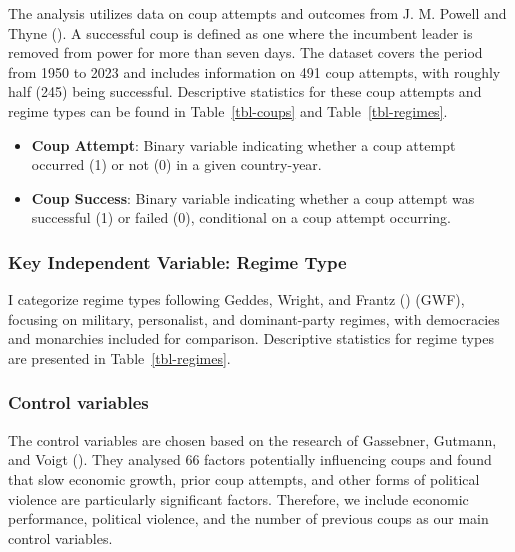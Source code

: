 \documentclass[
  12pt,
]{report}
\begin{document}
The analysis utilizes data on coup attempts and outcomes from J. M.
Powell and Thyne (). A successful coup is
defined as one where the incumbent leader is removed from power for more
than seven days. The dataset covers the period from 1950 to 2023 and
includes information on 491 coup attempts, with roughly half (245) being
successful. Descriptive statistics for these coup attempts and regime
types can be found in Table~\ref{tbl-coups} and Table~\ref{tbl-regimes}.

\begin{itemize}
\item
  \textbf{Coup Attempt}: Binary variable indicating whether a coup
  attempt occurred (1) or not (0) in a given country-year.
\item
  \textbf{Coup Success}: Binary variable indicating whether a coup
  attempt was successful (1) or failed (0), conditional on a coup
  attempt occurring.
\end{itemize}

\subsubsection{Key Independent Variable: Regime
Type}\label{sec-chapter2322}

I categorize regime types following Geddes, Wright, and Frantz
() (GWF), focusing on military,
personalist, and dominant-party regimes, with democracies and monarchies
included for comparison. Descriptive statistics for regime types are
presented in Table~\ref{tbl-regimes}.

\subsubsection*{Control variables}\label{control-variables}

The control variables are chosen based on the research of Gassebner,
Gutmann, and Voigt (). They analysed
66 factors potentially influencing coups and found that slow economic
growth, prior coup attempts, and other forms of political violence are
particularly significant factors. Therefore, we include economic
performance, political violence, and the number of previous coups as our
main control variables.
\end{document}

